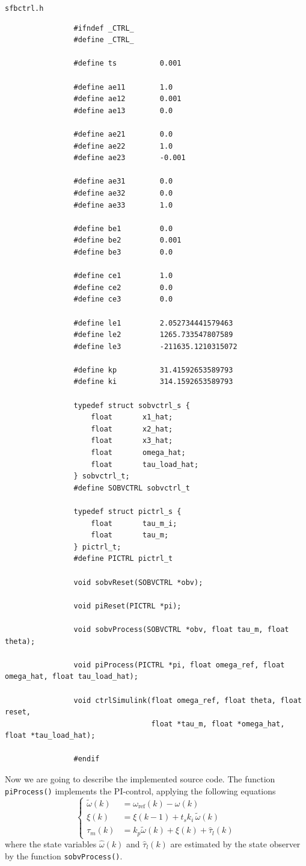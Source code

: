 \documentclass[11pt,a4paper,oneside]{book}
\numberwithin{equation}{section}
\theoremstyle{it}
\theoremstyle{definition}
\begin{document}
	\begin{mybox}
		\begin{center}
			{\selectfont \verb+sfbctrl.h+}
		\end{center}
		{\selectfont \footnotesize \noindent
			\begin{verbatim}
				#ifndef _CTRL_
				#define _CTRL_
				
				#define ts			0.001
				
				#define ae11		1.0
				#define ae12		0.001
				#define ae13		0.0
				
				#define ae21		0.0
				#define ae22		1.0
				#define ae23		-0.001
				
				#define ae31		0.0
				#define ae32		0.0
				#define ae33		1.0
				
				#define be1			0.0
				#define be2			0.001
				#define be3			0.0
				
				#define ce1			1.0
				#define ce2			0.0
				#define ce3			0.0
				
				#define le1			2.052734441579463
				#define le2			1265.733547807589
				#define le3			-211635.1210315072
				
				#define kp			31.41592653589793
				#define ki			314.1592653589793
				
				typedef struct sobvctrl_s {
				    float		x1_hat;			
				    float		x2_hat;					
				    float		x3_hat;					
				    float		omega_hat;					
				    float		tau_load_hat;					
				} sobvctrl_t;
				#define SOBVCTRL sobvctrl_t
				
				typedef struct pictrl_s {
				    float		tau_m_i;			
				    float		tau_m;			
				} pictrl_t;
				#define PICTRL pictrl_t
				
				void sobvReset(SOBVCTRL *obv);
				
				void piReset(PICTRL *pi);
				
				void sobvProcess(SOBVCTRL *obv, float tau_m, float theta);
				
				void piProcess(PICTRL *pi, float omega_ref, float omega_hat, float tau_load_hat);
				
				void ctrlSimulink(float omega_ref, float theta, float reset, 
				                  float *tau_m, float *omega_hat, float *tau_load_hat);
				
				#endif
		\end{verbatim}}
	\end{mybox}
	
	
	Now we are going to describe the implemented source code. The function \texttt{piProcess()} implements the PI-control, applying the following equations
	\begin{equation} \label{picontrol}
		\left\lbrace \begin{aligned}
			\tilde{\omega}(k)&=\omega_\text{ref}(k)-\omega(k)\\[6pt]
			\xi(k) &= \xi(k-1) + t_sk_i\,\tilde{\omega}(k) \\[6pt]
			\tau_m(k) &= k_p\tilde{\omega}(k)+ \xi(k) + \hat{\tau}_l(k) 
		\end{aligned}\right. 
	\end{equation} 
	where the state variables $\hat{\omega}(k)$ and $\hat{\tau}_l(k)$ are estimated by the state observer by the function \texttt{sobvProcess()}.
	
\end{document}
